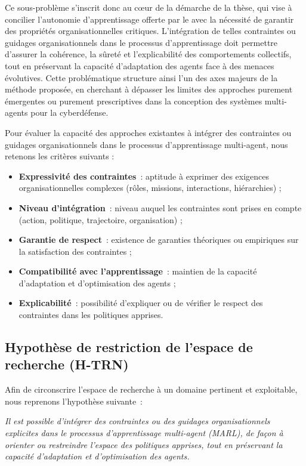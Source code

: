 Ce sous-problème s'inscrit donc au cœur de la démarche de la thèse, qui vise à concilier l'autonomie d'apprentissage offerte par le  avec la nécessité de garantir des propriétés organisationnelles critiques. L'intégration de telles contraintes ou guidages organisationnels dans le processus d'apprentissage doit permettre d'assurer la cohérence, la sûreté et l'explicabilité des comportements collectifs, tout en préservant la capacité d'adaptation des agents face à des menaces évolutives. Cette problématique structure ainsi l'un des axes majeurs de la méthode proposée, en cherchant à dépasser les limites des approches purement émergentes ou purement prescriptives dans la conception des systèmes multi-agents pour la cyberdéfense.

Pour évaluer la capacité des approches existantes à intégrer des contraintes ou guidages organisationnels dans le processus d'apprentissage multi-agent, nous retenons les critères suivants :
\begin{itemize}
  \item \textbf{Expressivité des contraintes}~: aptitude à exprimer des exigences organisationnelles complexes (rôles, missions, interactions, hiérarchies) ;
  \item \textbf{Niveau d’intégration}~: niveau auquel les contraintes sont prises en compte (action, politique, trajectoire, organisation) ;
  \item \textbf{Garantie de respect}~: existence de garanties théoriques ou empiriques sur la satisfaction des contraintes ;
  \item \textbf{Compatibilité avec l’apprentissage}~: maintien de la capacité d’adaptation et d’optimisation des agents ;
  \item \textbf{Explicabilité}~: possibilité d’expliquer ou de vérifier le respect des contraintes dans les politiques apprises.
\end{itemize}

\subsection*{Hypothèse de restriction de l’espace de recherche (H-TRN)}

Afin de circonscrire l’espace de recherche à un domaine pertinent et exploitable, nous reprenons l’hypothèse suivante~:

\textit{Il est possible d’intégrer des contraintes ou des guidages organisationnels explicites dans le processus d’apprentissage multi-agent (MARL), de façon à orienter ou restreindre l’espace des politiques apprises, tout en préservant la capacité d’adaptation et d’optimisation des agents.}

